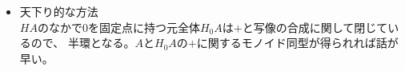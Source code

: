 \begin{itemize}
\begin{itemize}
\begin{equation}
\begin{split}
{					1_M & 0^* & 1_M & f_2 \\
					f_2 & 0^* & f_2 & 1_M + ? \\
				} \\
			\end{split}\end{equation} %
			$f_2+1_M$と$f_2f_2=f_2+f_2$のところが未定である。
			こうやって、群表を埋めていった結果と$A$がモノイド同型になることを示せればよい。
			この方法で、$A$が可算集合の場合には構成的に乗法が定義できるように思える。
			\item 天下り的な方法 \\
			$HA$のなかで$0$を固定点に持つ元全体$H_0A$は$+$と写像の合成に関して閉じているので、
			半環となる。$A$と$H_0A$の$+$に関するモノイド同型が得られれば話が早い。
		\end{itemize}
	\end{itemize}
\endgroup %
